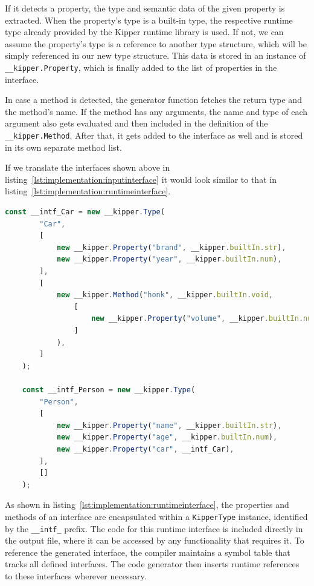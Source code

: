 If it detects a property, the type and semantic data of the given property is extracted. When the property's type is a built-in type, the respective runtime type already provided by the Kipper runtime library is used. If not, we can assume the property's type is a reference to another type structure, which will be simply referenced in our new type structure. This data is stored in an instance of \lstinline|__kipper.Property|, which is finally added to the list of properties in the interface.

In case a method is detected, the generator function fetches the return type and the method's name. If the method has any arguments, the name and type of each argument also gets evaluated and then included in the definition of the \lstinline|__kipper.Method|. After that, it gets added to the interface as well and is stored in its own separate method list.

If we translate the interfaces shown above in listing~\ref{lst:implementation:inputinterface} it would look similar to that in listing~\ref{lst:implementation:runtimeinterface}.

\begin{lstlisting}[language=Typescript,caption=The runtime representation of the previous interfaces,label=lst:implementation:runtimeinterface]
	const __intf_Car = new __kipper.Type(
		"Car",
		[
			new __kipper.Property("brand", __kipper.builtIn.str),
			new __kipper.Property("year", __kipper.builtIn.num),
		],
		[
			new __kipper.Method("honk", __kipper.builtIn.void,
				[
					new __kipper.Property("volume", __kipper.builtIn.num),
				]
			),
		]
	);

	const __intf_Person = new __kipper.Type(
		"Person",
		[
			new __kipper.Property("name", __kipper.builtIn.str),
			new __kipper.Property("age", __kipper.builtIn.num),
			new __kipper.Property("car", __intf_Car),
		],
		[]
	);
\end{lstlisting}

As shown in listing~\ref{lst:implementation:runtimeinterface}, the properties and methods of an interface are encapsulated within a \lstinline|KipperType| instance, identified by the  \lstinline|__intf_| prefix. The code for this runtime interface is included directly in the output file, where it can be accessed by any functionality that requires it. To reference the generated interface, the compiler maintains a symbol table that tracks all defined interfaces. The code generator then inserts runtime references to these interfaces wherever necessary.

